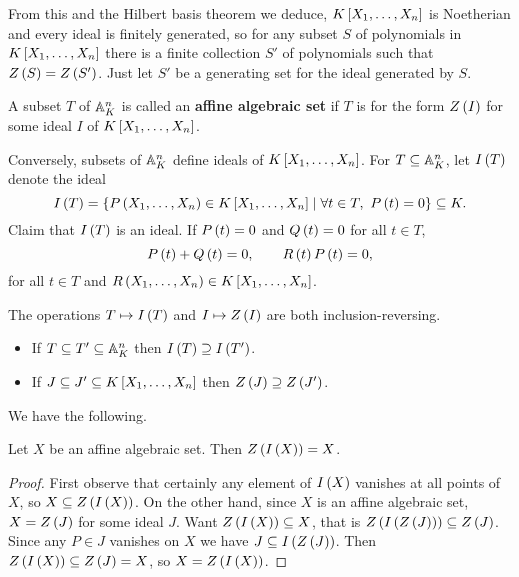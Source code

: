 From this and the Hilbert basis theorem we deduce, $ K\sb{X_1, \dots, X_n} $ is Noetherian and every ideal is finitely generated, so for any subset $ S $ of polynomials in $ K\sb{X_1, \dots, X_n} $ there is a finite collection $ S' $ of polynomials such that $ Z\rb{S} = Z\rb{S'} $. Just let $ S' $ be a generating set for the ideal generated by $ S $.

\begin{definition}
A subset $ T $ of $ \A_K^n $ is called an \textbf{affine algebraic set} if $ T $ is for the form $ Z\rb{I} $ for some ideal $ I $ of $ K\sb{X_1, \dots, X_n} $.
\end{definition}

Conversely, subsets of $ \A_K^n $ define ideals of $ K\sb{X_1, \dots, X_n} $. For $ T \subseteq \A_K^n $, let $ I\rb{T} $ denote the ideal
$$ I\rb{T} = \cb{P\rb{X_1, \dots, X_n} \in K\sb{X_1, \dots, X_n} \mid \forall t \in T, \ P\rb{t} = 0} \subseteq K. $$
Claim that $ I\rb{T} $ is an ideal. If $ P\rb{t} = 0 $ and $ Q\rb{t} = 0 $ for all $ t \in T $,
$$ P\rb{t} + Q\rb{t} = 0, \qquad R\rb{t}P\rb{t} = 0, $$
for all $ t \in T $ and $ R\rb{X_1, \dots, X_n} \in K\sb{X_1, \dots, X_n} $.

\begin{note*}
The operations $ T \mapsto I\rb{T} $ and $ I \mapsto Z\rb{I} $ are both inclusion-reversing.
\begin{itemize}
\item If $ T \subseteq T' \subseteq \A_K^n $ then $ I\rb{T} \supseteq I\rb{T'} $.
\item If $ J \subseteq J' \subseteq K\sb{X_1, \dots, X_n} $ then $ Z\rb{J} \supseteq Z\rb{J'} $.
\end{itemize}
\end{note*}

We have the following.

\begin{lemma}
Let $ X $ be an affine algebraic set. Then $ Z\rb{I\rb{X}} = X $.
\end{lemma}

\begin{proof}
First observe that certainly any element of $ I\rb{X} $ vanishes at all points of $ X $, so $ X \subseteq Z\rb{I\rb{X}} $. On the other hand, since $ X $ is an affine algebraic set, $ X = Z\rb{J} $ for some ideal $ J $. Want $ Z\rb{I\rb{X}} \subseteq X $, that is $ Z\rb{I\rb{Z\rb{J}}} \subseteq Z\rb{J} $. Since any $ P \in J $ vanishes on $ X $ we have $ J \subseteq I\rb{Z\rb{J}} $. Then $ Z\rb{I\rb{X}} \subseteq Z\rb{J} = X $, so $ X = Z\rb{I\rb{X}} $.
\end{proof}

